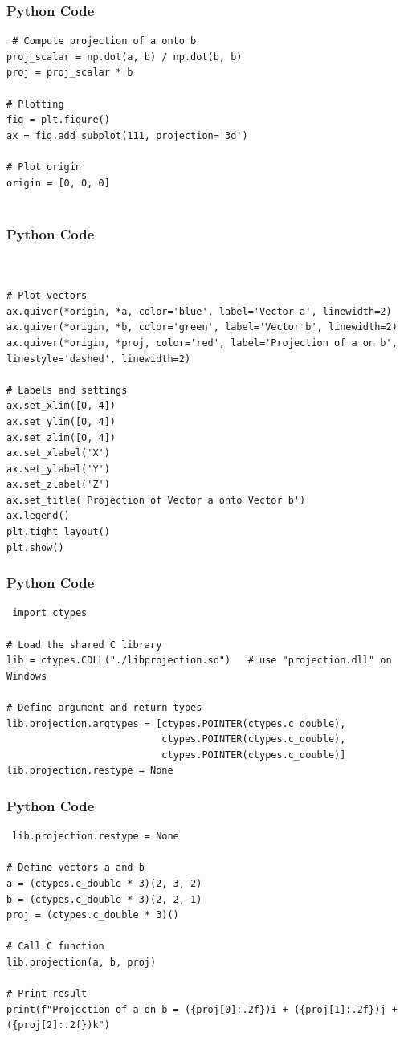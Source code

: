 \documentclass{beamer}
\begin{document}
\begin{frame}[fragile]
    \frametitle{Python Code}
    \begin{lstlisting}
 # Compute projection of a onto b
proj_scalar = np.dot(a, b) / np.dot(b, b)
proj = proj_scalar * b

# Plotting
fig = plt.figure()
ax = fig.add_subplot(111, projection='3d')

# Plot origin
origin = [0, 0, 0]


    \end{lstlisting}
\end{frame}

\begin{frame}[fragile]
    \frametitle{Python Code}
    \begin{lstlisting}
 

# Plot vectors
ax.quiver(*origin, *a, color='blue', label='Vector a', linewidth=2)
ax.quiver(*origin, *b, color='green', label='Vector b', linewidth=2)
ax.quiver(*origin, *proj, color='red', label='Projection of a on b', linestyle='dashed', linewidth=2)

# Labels and settings
ax.set_xlim([0, 4])
ax.set_ylim([0, 4])
ax.set_zlim([0, 4])
ax.set_xlabel('X')
ax.set_ylabel('Y')
ax.set_zlabel('Z')
ax.set_title('Projection of Vector a onto Vector b')
ax.legend()
plt.tight_layout()
plt.show()

    \end{lstlisting}
\end{frame}

\begin{frame}[fragile]
    \frametitle{Python Code}
    \begin{lstlisting}
 import ctypes

# Load the shared C library
lib = ctypes.CDLL("./libprojection.so")   # use "projection.dll" on Windows

# Define argument and return types
lib.projection.argtypes = [ctypes.POINTER(ctypes.c_double),
                           ctypes.POINTER(ctypes.c_double),
                           ctypes.POINTER(ctypes.c_double)]
lib.projection.restype = None

    \end{lstlisting}
\end{frame}
\begin{frame}[fragile]
    \frametitle{Python Code}
    \begin{lstlisting}
 lib.projection.restype = None

# Define vectors a and b
a = (ctypes.c_double * 3)(2, 3, 2)
b = (ctypes.c_double * 3)(2, 2, 1)
proj = (ctypes.c_double * 3)()

# Call C function
lib.projection(a, b, proj)

# Print result
print(f"Projection of a on b = ({proj[0]:.2f})i + ({proj[1]:.2f})j + ({proj[2]:.2f})k")

    \end{lstlisting}
\end{frame}
 
\end{document}
